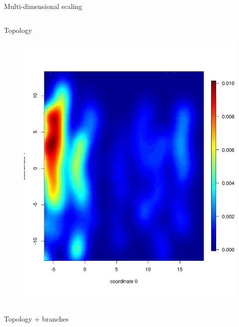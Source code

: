 \documentclass[newPxFont,numfooter,sectionpages]{beamer}
\begin{document}
\begin{frame}{Multi-dimensional scaling}
 \begin{column}{0.5\textwidth}
 \begin{center}
   Topology
\begin{figure}
	\includegraphics[width=\textwidth]{figures/RF_posterior_denv4.pdf}
\end{figure}
 \end{center}
\end{column}
 \begin{column}{0.5\textwidth}
  \begin{center}
   Topology + branches
\begin{figure}

\end{figure}
\end{center}
\end{column}
\end{frame}
\end{document}

